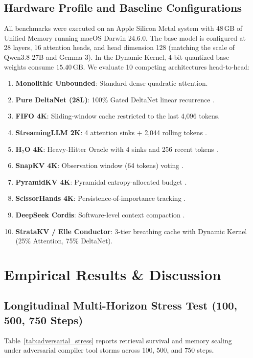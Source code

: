 \documentclass[11pt,letterpaper]{article}
\theoremstyle{definition}
\begin{document}
\subsection{Hardware Profile and Baseline Configurations}
All benchmarks were executed on an Apple Silicon Metal system with 48\,GB of Unified Memory running macOS Darwin 24.6.0. The base model is configured at 28 layers, 16 attention heads, and head dimension 128 (matching the scale of Qwen3.8-27B and Gemma 3). In the Dynamic Kernel, 4-bit quantized base weights consume $15.40$\,GB. We evaluate 10 competing architectures head-to-head:
\begin{enumerate}
    \item \textbf{Monolithic Unbounded}: Standard dense quadratic attention.
    \item \textbf{Pure DeltaNet (28L)}: 100\% Gated DeltaNet linear recurrence \cite{yang2024deltanet}.
    \item \textbf{FIFO 4K}: Sliding-window cache restricted to the last 4,096 tokens.
    \item \textbf{StreamingLLM 2K}: 4 attention sinks + 2,044 rolling tokens \cite{xiao2023streamingllm}.
    \item \textbf{H$_2$O 4K}: Heavy-Hitter Oracle with 4 sinks and 256 recent tokens \cite{zhang2023h2o}.
    \item \textbf{SnapKV 4K}: Observation window (64 tokens) voting \cite{li2024snapkv}.
    \item \textbf{PyramidKV 4K}: Pyramidal entropy-allocated budget \cite{cai2024pyramidkv}.
    \item \textbf{ScissorHands 4K}: Persistence-of-importance tracking \cite{liu2023scissorhands}.
    \item \textbf{DeepSeek Cordis}: Software-level context compaction \cite{shi2026cordis}.
    \item \textbf{StrataKV / Elle Conductor}: 3-tier breathing cache with Dynamic Kernel (25\% Attention, 75\% DeltaNet).
\end{enumerate}

\section{Empirical Results \& Discussion}
\label{sec:results}

\subsection{Longitudinal Multi-Horizon Stress Test (100, 500, 750 Steps)}
Table~\ref{tab:adversarial_stress} reports retrieval survival and memory scaling under adversarial compiler tool storms across 100, 500, and 750 steps.
\end{document}
